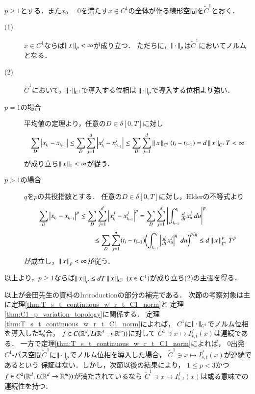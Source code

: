 \begin{screen}
	\begin{thm}\label{thm:C1_p_variation_topology}
		$p \geq 1$とする．また$x_0 = 0$を満たす$x \in C^1$の全体が作る線形空間を$\tilde{C}^1$とおく．
		\begin{description}
			\item[(1)] $x \in C^1$ならば$\left\|\, x\, \right\|_{p} < \infty$が成り立つ．
				ただちに，$\left\|\, \cdot\, \right\|_{p}$は$\tilde{C}^1$においてノルムとなる．
			\item[(2)] $\tilde{C}^1$において，$\left\|\, \cdot\, \right\|_{C^1}$で導入する位相は
				$\left\|\, \cdot\, \right\|_{p}$で導入する位相より強い．
		\end{description}
	\end{thm}
\end{screen}

\begin{prf}\mbox{}
	\begin{description}
		\item[$p = 1$の場合]
			平均値の定理より，任意の$D \in \delta[0,T]$に対し
			\begin{align}
				\sum_D \left| x_{t_i} - x_{t_{i-1}} \right|
				\leq \sum_D \sum_{j=1}^d \left| x^j_{t_i} - x^j_{t_{i-1}} \right|
				\leq \sum_D \sum_{j=1}^d \left\|\, x\, \right\|_{C^1}(t_i - t_{i-1})
				= d\left\|\, x\, \right\|_{C^1}T < \infty
			\end{align}
			が成り立ち$\left\|\, x\, \right\|_{1} < \infty$が従う．
		
		\item[$p > 1$の場合] $q$を$p$の共役指数とする．
			任意の$D \in \delta[0,T]$に対し，Hlderの不等式より
			\begin{align}
				\sum_D \left| x_{t_i} - x_{t_{i-1}} \right|^p
				&\leq \sum_D \sum_{j=1}^d \left| x^j_{t_i} - x^j_{t_{i-1}} \right|^p
				= \sum_D \sum_{j=1}^d \left| \int_{t_{i-1}}^{t_i} \tfrac{d}{dt} x^j_{u}\ du \right|^p \\
				&\qquad \leq \sum_D \sum_{j=1}^d (t_i - t_{i-1})
					\biggl( \int_{t_{i-1}}^{t_i} \left| \tfrac{d}{dt} x^j_{u} \right|^q\ du \biggr)^{p/q}
				\leq d\left\|\, x\, \right\|_{C^1}^p T^p
			\end{align}
			が成立し，$\left\|\, x\, \right\|_{p} < \infty$が従う．
	\end{description}
	以上より，$p \geq 1$ならば$\left\|\, x\, \right\|_{p} \leq dT\left\|\, x\, \right\|_{C^1}\ (x \in C^1)$が成り立ち(2)の主張を得る．
	\QED
\end{prf}

	以上が会田先生の資料のIntroductionの部分の補完である．
	次節の考察対象は主に定理\ref{thm:T_s_t_continuous_w_r_t_C1_norm}と
	定理\ref{thm:C1_p_variation_topology}に関係する．
	定理\ref{thm:T_s_t_continuous_w_r_t_C1_norm}によれば，
	$C^1$に$\left\|\, \cdot\, \right\|_{C^1}$でノルム位相を導入した場合，
	$f \in C(\mathbb{R}^d,L(\mathbb{R}^d \rightarrow \mathbb{R}^m))$に対して
	$C^1 \ni x \longmapsto I^f_{s,t}(x)$は連続である．
	一方で定理\ref{thm:T_s_t_continuous_w_r_t_C1_norm}によれば，
	0出発$C^1$-パス空間$\tilde{C}^1$に$\left\|\, \cdot\, \right\|_{p}$でノルム位相を導入した場合，
	$\tilde{C}^1 \ni x \longmapsto I^f_{s,t}(x)$が連続であるという
	保証はない．しかし，次節以後の結果により，
	$1 \leq p < 3$かつ$f \in C^2(\mathbb{R}^d,L(\mathbb{R}^d \rightarrow \mathbb{R}^m))$が満たされているなら
	$\tilde{C}^1 \ni x \longmapsto I^f_{s,t}(x)$は或る意味での連続性を持つ．
